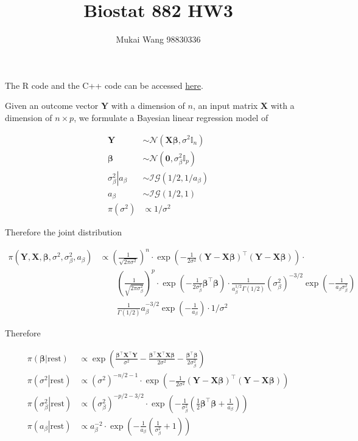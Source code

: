 \documentclass[12pt]{article}
\title{Biostat 882 HW3}
\date{}
\author{Mukai Wang 98830336}
\begin{document}
\maketitle

The R code and the C++ code can be accessed \href{https://github.com/mkbwang/BIOSTAT882/tree/master/HW3}{here}.

Given an outcome vector $\bm{Y}$ with a dimension of $n$, an input matrix $\bm{X}$ with a dimension of $n\times p$, we formulate a Bayesian linear regression model of 

\begin{align*}
	\bm{Y} &\sim \mathcal{N}\left(\bm{X}\bm{\beta}, \sigma^2 \mathbb{I}_{n} \right)\\
	\bm{\beta} & \sim \mathcal{N}(\bm{0}, \sigma_{\beta}^2 \mathbb{I}_p)\\
	\left.\sigma_{\beta}^2 \right\vert a_\beta &\sim \mathcal{IG}(1/2, 1/a_\beta)\\
	a_\beta & \sim \mathcal{IG}(1/2, 1)\\
	\pi(\sigma^2) & \propto 1/\sigma^2
\end{align*}

Therefore the joint distribution 

\begin{align*}
	\pi(\bm{Y}, \bm{X}, \bm{\beta}, \sigma^2, \sigma_{\beta}^2, a_\beta) & \propto \left(\frac{1}{\sqrt{2\pi \sigma^2}} \right)^n \cdot \exp( -\frac{1}{2\sigma^2}(\bm{Y} - \bm{X}\bm{\beta})^\top (\bm{Y} - \bm{X}\bm{\beta}) ) \cdot \\
	& \qquad \left( \frac{1}{\sqrt{2\pi \sigma_{\beta}^2}} \right)^p \cdot \exp(-\frac{1}{2\sigma_{\beta}^2} \bm{\beta}^\top \bm{\beta})\cdot \frac{1}{a_{\beta}^{1/2}\Gamma(1/2) } (\sigma_{\beta}^{2})^{-3/2}\exp(-\frac{1}{a_\beta \sigma_{\beta}^2})\\
	&\qquad \frac{1}{\Gamma(1/2)}a_{\beta}^{-3/2}\exp(-\frac{1}{a_\beta})\cdot 1/\sigma^2
\end{align*}

Therefore

\begin{align*}
	\pi\left(\left.\bm{\beta}\right\vert\text{rest}\right) &\propto \exp(\frac{\bm{\beta}^\top\bm{X}^\top\bm{Y}}{\sigma^2}-\frac{\bm{\beta}^\top \bm{X}^\top \bm{X} \bm{\beta}}{2\sigma^2} - \frac{\bm{\beta}^\top \bm{\beta}}{2\sigma_{\beta}^2} ) \\
	\pi\left(\left.\sigma^2\right\vert\text{rest}\right) &\propto (\sigma^2)^{-n/2-1}\cdot \exp( -\frac{1}{2\sigma^2}(\bm{Y} - \bm{X}\bm{\beta})^\top (\bm{Y} - \bm{X}\bm{\beta}) )\\
	\pi\left(\left.\sigma_{\beta}^2\right\vert\text{rest}\right) & \propto (\sigma_{\beta}^2)^{-p/2-3/2}\cdot \exp(-\frac{1}{\sigma_{\beta}^2} \left(\frac{1}{2}\bm{\beta}^\top \bm{\beta} + \frac{1}{a_\beta} \right)) \\
	\pi\left(\left.a_{\beta}\right\vert\text{rest}\right) & \propto a_{\beta}^{-2}\cdot \exp(-\frac{1}{a_\beta} \left(\frac{1}{\sigma_{\beta}^2} + 1\right))
\end{align*}
\end{document}
